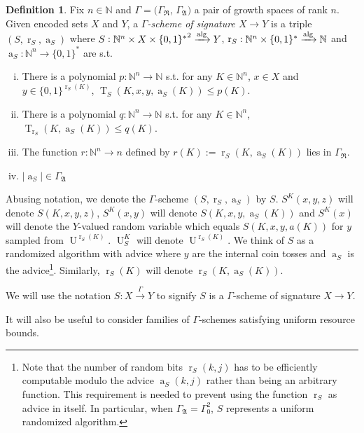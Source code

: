 \documentclass{article}
\numberwithin{equation}{section}
\theoremstyle{definition}
\newtheorem{definition}{Definition}[section]
\theoremstyle{plain}
\newcommand{\Bool}{\{0,1\}}
\newcommand{\Words}{{\Bool^*}}
\newcommand{\WordsLen}[1]{{\Bool^{#1}}}
\DeclareMathOperator{\T}{T}
\DeclareMathOperator{\R}{r}
\DeclareMathOperator{\A}{a}
\DeclareMathOperator{\U}{U}
\newcommand{\Nats}{\mathbb{N}}
\newcommand{\Abs}[1]{\lvert #1 \rvert}
\newcommand{\GrowR}{\Gamma_{\mathfrak{R}}}
\newcommand{\GrowA}{\Gamma_{\mathfrak{A}}}
\newcommand{\Alg}{\xrightarrow{\textnormal{alg}}}
\newcommand{\Scheme}{\xrightarrow{\Gamma}}
\begin{document}
\begin{definition}

Fix $n \in \Nats$ and $\Gamma=(\GrowR$, $\GrowA)$ a pair of growth spaces of rank $n$. Given encoded sets $X$ and $Y$, a \emph{$\Gamma$-scheme of signature $X \rightarrow Y$} is a triple $(S,\R_S,\A_S)$ where $S: \Nats^n \times X \times \Words^2 \Alg Y$, $\R_S: \Nats^n \times \Words \Alg \Nats$ and $\A_S: \Nats^n \rightarrow \Words$ are s.t.

\begin{enumerate}[(i)]

\item There is a polynomial $p: \Nats^n \rightarrow \Nats$ s.t. for any $K \in \Nats^n$, $x \in X$ and $y \in \WordsLen{\R_S(K)}$, $\T_S(K,x,y,\A_S(K)) \leq p(K)$.

\item There is a polynomial $q: \Nats^n \rightarrow \Nats$ s.t. for any $K \in \Nats^n$, ${\T_{\R_S}(K,\A_S(K)) \leq q(K)}$.

\item The function $r: \Nats^n \rightarrow n$ defined by $r(K):=\R_S(K,\A_S(K))$ lies in $\GrowR$.

\item $\Abs{\A_S} \in \GrowA$

\end{enumerate}

Abusing notation, we denote the $\Gamma$-scheme $(S,\R_S,\A_S)$ by $S$. $S^K(x,y,z)$ will denote $S(K,x,y,z)$, $S^K(x,y)$ will denote $S(K,x,y,\A_S(K))$ and $S^K(x)$ will denote the $Y$-valued random variable which equals $S(K,x,y,a(K))$ for $y$ sampled from $\U^{\R_S(K)}$. $\U_S^K$ will denote $\U^{\R_S(K)}$. We think of $S$ as a randomized algorithm with advice where $y$ are the internal coin tosses and $\A_S$ is the advice\footnote{Note that the number of random bits $\R_S(k,j)$ has to be efficiently computable modulo the advice $\A_S(k,j)$ rather than being an arbitrary function. This requirement is needed to prevent using the function $\R_S$ as advice in itself. In particular, when $\GrowA=\Gamma_0^2$, $S$ represents a uniform randomized algorithm.}. Similarly, $\R_S(K)$ will denote $\R_S(K,\A_S(K))$.

We will use the notation $S: X \Scheme Y$ to signify $S$ is a $\Gamma$-scheme of signature $X \rightarrow Y$.

\end{definition}

It will also be useful to consider families of $\Gamma$-schemes satisfying uniform resource bounds.
\end{document}
